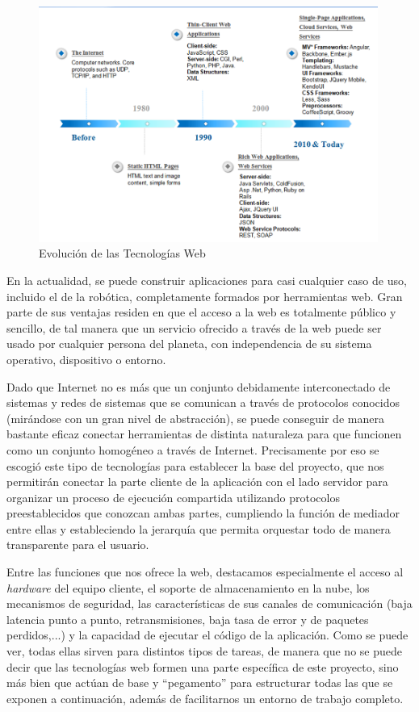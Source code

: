 \begin{figure}[!hbtp]  \centering\noindent
    \includegraphics[width=0.99\textwidth]{figures/web-history.png}
    \caption{Evolución de las Tecnologías Web}
    \label{web}
\end{figure}

En la actualidad, se puede construir aplicaciones para casi cualquier caso de uso, incluido el de la robótica, completamente formados por herramientas web. Gran parte de sus ventajas residen en que el acceso a la web es totalmente público y sencillo, de tal manera que un servicio ofrecido a través de la web puede ser usado por cualquier persona del planeta, con independencia de su sistema operativo, dispositivo o entorno.

Dado que Internet no es más que un conjunto debidamente interconectado de sistemas y redes de sistemas que se comunican a través de protocolos conocidos (mirándose con un gran nivel de abstracción), se puede conseguir de manera bastante eficaz conectar herramientas de distinta naturaleza para que funcionen como un conjunto homogéneo a través de Internet. Precisamente por eso se escogió este tipo de tecnologías para establecer la base del proyecto, que nos permitirán conectar la parte cliente de la aplicación con el lado servidor para organizar un proceso de ejecución compartida utilizando protocolos preestablecidos que conozcan ambas partes, cumpliendo la función de mediador entre ellas y estableciendo la jerarquía que permita orquestar todo de manera transparente para el usuario.

Entre las funciones que nos ofrece la web, destacamos especialmente el acceso al \textit{hardware} del equipo cliente, el soporte de almacenamiento en la nube, los mecanismos de seguridad, las características de sus canales de comunicación (baja latencia punto a punto, retransmisiones, baja tasa de error y de paquetes perdidos,...) y la capacidad de ejecutar el código de la aplicación. Como se puede ver, todas ellas sirven para distintos tipos de tareas, de manera que no se puede decir que las tecnologías web formen una parte específica de este proyecto, sino más bien que actúan de base y ``pegamento'' para estructurar todas las que se exponen a continuación, además de facilitarnos un entorno de trabajo completo.

